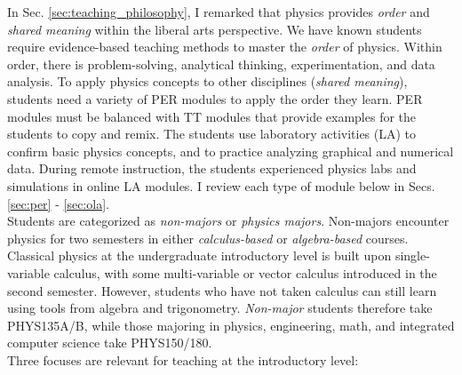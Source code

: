 \documentclass[../../../main.tex]{subfiles}
\begin{document}
In Sec. \ref{sec:teaching_philosophy}, I remarked that physics provides \textit{order} and \textit{shared meaning} within the liberal arts perspective.  We have known students require evidence-based teaching methods to master the \textit{order} of physics.  Within order, there is problem-solving, analytical thinking, experimentation, and data analysis.  To apply physics concepts to other disciplines (\textit{shared meaning}), students need a variety of PER modules to apply the order they learn.  PER modules must be balanced with TT modules that provide examples for the students to copy and remix.  The students use laboratory activities (LA) to confirm basic physics concepts, and to practice analyzing graphical and numerical data.  During remote instruction, the students experienced physics labs and simulations in online LA modules.  I review each type of module below in Secs. \ref{sec:per} - \ref{sec:ola}.
\\
\vspace{0.25cm}
Students are categorized as \textit{non-majors} or \textit{physics majors}.  Non-majors encounter physics for two semesters in either \textit{calculus-based} or \textit{algebra-based} courses.  Classical physics at the undergraduate introductory level is built upon single-variable calculus, with some multi-variable or vector calculus introduced in the second semester.  However, students who have not taken calculus can still learn using tools from algebra and trigonometry.  \textit{Non-major} students therefore take PHYS135A/B, while those majoring in physics, engineering, math, and integrated computer science take PHYS150/180.
\\
\vspace{0.25cm}
Three focuses are relevant for teaching at the introductory level:
\end{document}

